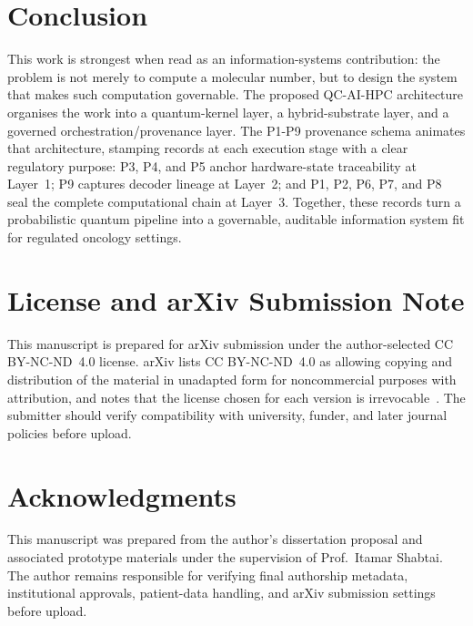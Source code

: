 \documentclass[11pt,letterpaper]{article}
\begin{document}
\section{Conclusion}

This work is strongest when read as an information-systems contribution: the problem is not
merely to compute a molecular number, but to design the system that makes such computation
governable.  The proposed QC-AI-HPC architecture organises
the work into a quantum-kernel layer, a hybrid-substrate layer, and a governed
orchestration/provenance layer.  The P1-P9 provenance schema animates that architecture,
stamping records at each execution stage with a clear regulatory purpose: P3, P4, and P5
anchor hardware-state traceability at Layer~1; P9 captures decoder lineage at Layer~2;
and P1, P2, P6, P7, and P8 seal the complete computational chain at Layer~3.  Together,
these records turn a probabilistic quantum pipeline into a governable, auditable
information system fit for regulated oncology settings.

\section*{License and arXiv Submission Note}

This manuscript is prepared for arXiv submission under the author-selected CC BY-NC-ND~4.0
license.  arXiv lists CC BY-NC-ND~4.0 as allowing copying and distribution of the material
in unadapted form for noncommercial purposes with attribution, and notes that the license
chosen for each version is irrevocable~\cite{arxiv2026license}.  The submitter should verify
compatibility with university, funder, and later journal policies before upload.

\section*{Acknowledgments}

This manuscript was prepared from the author's dissertation proposal and associated prototype
materials under the supervision of Prof.\ Itamar Shabtai.  The author remains responsible
for verifying final authorship metadata, institutional approvals, patient-data handling,
and arXiv submission settings before upload.
\end{document}
